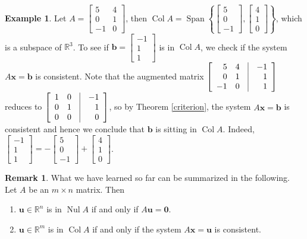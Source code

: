 \documentclass[12pt,letterpaper]{book}
\numberwithin{equation}{section}
\theoremstyle{definition}
\newtheorem{example}[thm]{\textbf{Example}}
\newtheorem{remark}[thm]{\textbf{Remark}}
\newcommand{\vu}{\bm{u}}
\newcommand{\vx}{\bm{x}}
\newcommand{\vb}{\bm{b}}
\newcommand{\veczero}{\bm{0}}
\newcommand{\Nul}{\operatorname{Nul}}
\newcommand{\Coll}{\operatorname{Col}}
\newcommand{\Span}{\operatorname{Span}}
\begin{document}
\begin{example} Let $A=\left[\begin{array}{rr} 5 & 4 \\ 0 & 1 \\ -1 &
0 \end{array}\right]$, then $\Coll A=\Span\left\{\left[\begin{array}{r}
5 \\ 0 \\ -1 \end{array}\right], \left[\begin{array}{r}
4 \\ 1 \\ 0 \end{array}\right]\right\}$, which is a subspace of $\mathbb{R}^3$. To see if $\vb=\left[\begin{array}{r}
-1 \\ 1 \\ 1 \end{array}\right]$ is in $\Coll A$, we check if the system $A\vx=\vb$ is consistent. Note that the augmented matrix
$\left[\begin{array}{rr@{\quad}|@{\quad}r} 5 & 4 & -1 \\ 0 & 1 & 1 \\ -1 & 0 & 1 \end{array}\right]$ reduces to $\left[\begin{array}{rr@{\quad}|@{\quad}r} 1 & 0 & -1 \\ 0 & 1 & 1 \\ 0 & 0 & 0 \end{array}\right]$, so by Theorem \ref{criterion}, the system $A\vx=\vb$ is consistent and hence we conclude that $\vb$ is sitting in $\Coll A$. Indeed, $\left[\begin{array}{r}
-1 \\ 1 \\ 1 \end{array}\right]=-\left[\begin{array}{r}
5 \\ 0 \\ -1 \end{array}\right]+\left[\begin{array}{r}
4 \\ 1 \\ 0 \end{array}\right]$.
\end{example}

\begin{remark} What we have learned so far can be summarized in the following. Let $A$ be an $m\times n$ matrix. Then
\begin{enumerate}
\item $\vu\in \mathbb{R}^n$ is in $\Nul A$ if and only if
$A\vu=\veczero$.
\item $\vu\in \mathbb{R}^m$ is in $\Coll A$ if and only if the
system $A\vx=\vu$ is consistent.
\end{enumerate}
\end{remark}
\end{document}
